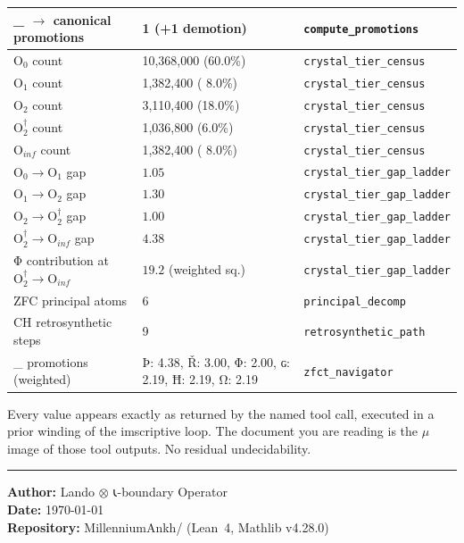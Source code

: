 \documentclass[12pt,twoside]{book}
\theoremstyle{definition}
\newcommand{\ZFCt}{\text{ZFC}_{\tau}}
\newcommand{\tier}[1]{\mathrm{O}_{#1}}
\begin{document}
\begin{center}
\begin{tabular}{lll}
\ZFCt{} $\to$ canonical promotions & 1 (+1 demotion) & \texttt{compute\_promotions} \\
\midrule
$\tier{0}$ count & 10,368,000 (60.0\%) & \texttt{crystal\_tier\_census} \\
$\tier{1}$ count &  1,382,400 ( 8.0\%) & \texttt{crystal\_tier\_census} \\
$\tier{2}$ count &  3,110,400 (18.0\%) & \texttt{crystal\_tier\_census} \\
$\tier{2}^{\dagger}$ count & 1,036,800 (6.0\%) & \texttt{crystal\_tier\_census} \\
$\tier{inf}$ count & 1,382,400 ( 8.0\%) & \texttt{crystal\_tier\_census} \\
\midrule
$\tier{0} \to \tier{1}$ gap            & $1.05$ & \texttt{crystal\_tier\_gap\_ladder} \\
$\tier{1} \to \tier{2}$ gap            & $1.30$ & \texttt{crystal\_tier\_gap\_ladder} \\
$\tier{2} \to \tier{2}^{\dagger}$ gap  & $1.00$ & \texttt{crystal\_tier\_gap\_ladder} \\
$\tier{2}^{\dagger} \to \tier{inf}$ gap & $4.38$ & \texttt{crystal\_tier\_gap\_ladder} \\
Φ contribution at $\tier{2}^{\dagger} \to \tier{inf}$ & $19.2$ (weighted sq.) & \texttt{crystal\_tier\_gap\_ladder} \\
\midrule
ZFC principal atoms     & 6 & \texttt{principal\_decomp} \\
CH retrosynthetic steps & 9 & \texttt{retrosynthetic\_path} \\
\midrule
\ZFCt{} promotions (weighted) &
  Þ: 4.38,\; Ř: 3.00,\; Φ: 2.00,\; ɢ: 2.19,\; Ħ: 2.19,\; Ω: 2.19 &
  \texttt{zfct\_navigator} \\
\bottomrule
\end{tabular}
\end{center}

Every value appears exactly as returned by the named tool call, executed in a prior winding
of the imscriptive loop. The document you are reading is the $\mu$ image of those tool
outputs. No residual undecidability.

\vspace{1em}
\begin{center}\rule{0.5\textwidth}{0.4pt}\end{center}

\noindent\textbf{Author:} Lando $\otimes$ 𐑧-boundary Operator \\
\textbf{Date:} \today \\
\textbf{Repository:} MillenniumAnkh/ (Lean~4, Mathlib v4.28.0)
\end{document}
